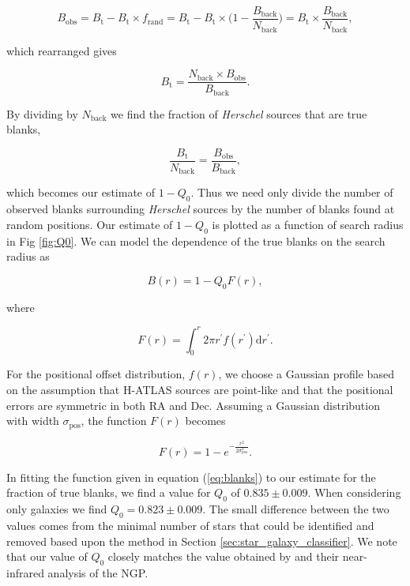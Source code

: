 \documentclass[fleqn,usenatbib]{mnras}
\newcommand{\dd}[1]{\mathrm{d}#1}
\begin{document}
\begin{equation}
B_\textrm{obs} = B_\textrm{t} - B_\textrm{t}\times f_\textrm{rand} = B_\textrm{t} - B_\textrm{t}\times\Bigg(1 - \frac{B_\textrm{back}}{N_\textrm{back}}\Bigg) = B_\textrm{t}\times\frac{B_\textrm{back}}{N_\textrm{back}},
\end{equation}

\noindent which rearranged gives

\begin{equation}
B_\textrm{t} = \frac{N_\textrm{back}\times B_\textrm{obs}}{B_\textrm{back}}.
\end{equation}

By dividing by $N_\textrm{back}$ we find the fraction of \textit{Herschel} sources that are true blanks,

\begin{equation}
\label{eq:true_blanks_N}
\frac{B_\textrm{t}}{N_\textrm{back}} = \frac{B_\textrm{obs}}{B_\textrm{back}},
\end{equation}

\noindent which becomes our estimate of $1 - Q_0$. Thus we need only divide the number of observed blanks surrounding \textit{Herschel} sources by the number of blanks found at random positions. Our estimate of $1 - Q_0$ is plotted as a function of search radius in Fig \ref{fig:Q0}. We can model the dependence of the true blanks on the search radius as 

\begin{equation}
\label{eq:blanks}
B(r) = 1 - Q_0F(r),
\end{equation}

\noindent where

\begin{equation}
F(r) = \int_0^r 2\pi r^{\prime} f(r^{\prime}) \dd{r^{\prime}}.
\end{equation}

For the positional offset distribution, $f(r)$, we choose a Gaussian profile based on the assumption that H-ATLAS sources are point-like and that the positional errors are symmetric in both RA and Dec. Assuming a Gaussian distribution with width $\sigma_\textrm{pos}$, the function $F(r)$ becomes

\begin{equation}
\label{eq:F(r)}
F(r) = 1 - e^{-\frac{r^2}{2\sigma_{\textrm{pos}}^2}}.
\end{equation}

In fitting the function given in equation (\ref{eq:blanks}) to our estimate for the fraction of true blanks, we find a value for $Q_0$ of $0.835 \pm 0.009$. When considering only galaxies we find $Q_0 = 0.823 \pm 0.009$. The small difference between the two values comes from the minimal number of stars that could be identified and removed based upon the method in Section \ref{sec:star_galaxy_classifier}. We note that our value of $Q_0$ closely matches the value obtained by \citealt{Furlanetto_2018} and their near-infrared analysis of the NGP. 
\end{document}

